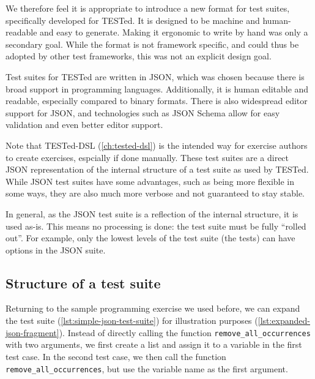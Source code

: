 \documentclass[../main]{subfiles}
\begin{document}
We therefore feel it is appropriate to introduce a new format for test suites, specifically developed for TESTed.
It is designed to be machine and human-readable and easy to generate.
Making it ergonomic to write by hand was only a secondary goal.
While the format is not framework specific, and could thus be adopted by other test frameworks, this was not an explicit design goal.

Test suites for TESTed are written in JSON, which was chosen because there is broad support in programming languages.
Additionally, it is human editable and readable, especially compared to binary formats.
There is also widespread editor support for JSON, and technologies such as JSON Schema allow for easy validation and even better editor support.

Note that TESTed-DSL (\cref{ch:tested-dsl}) is the intended way for exercise authors to create exercises, espcially if done manually.
These test suites are a direct JSON representation of the internal structure of a test suite as used by TESTed.
While JSON test suites have some advantages, such as being more flexible in some ways, they are also much more verbose and not guaranteed to stay stable.

In general, as the JSON test suite is a reflection of the internal structure, it is used as-is.
This means no processing is done: the test suite must be fully ``rolled out''.
For example, only the lowest levels of the test suite (the tests) can have options in the JSON suite.

\subsection{Structure of a test suite}\label{subsec:structure-of-a-test-suite}

Returning to the sample programming exercise we used before, we can expand the test suite (\cref{lst:simple-json-test-suite}) for illustration purposes (\cref{lst:expanded-json-fragment}).
Instead of directly calling the function \texttt{remove\_all\_occurrences} with two arguments, we first create a list and assign it to a variable in the first test case.
In the second test case, we then call the function \texttt{remove\_all\_occurrences}, but use the variable name as the first argument.
\end{document}

